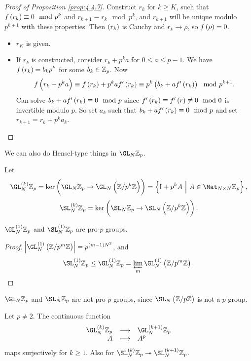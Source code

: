\begin{proof}[Proof of Proposition \ref{prop:4.4.7}]
Construct $ r_k $ for $ k \ge K $, such that $ f\br{r_k} \equiv 0 \mod p^k $ and $ r_{k + 1} \equiv r_k \mod p^k $, and $ r_{k + 1} $ will be unique modulo $ p^{k + 1} $ with these properties. Then $ \br{r_k} $ is Cauchy and $ r_k \to \rho $, so $ f\br{\rho} = 0 $.
\begin{itemize}
\item $ r_K $ is given.
\item If $ r_k $ is constructed, consider $ r_k + p^ka $ for $ 0 \le a \le p - 1 $. We have $ f\br{r_k} = b_kp^k $ for some $ b_k \in \mathbb{Z}_p $. Now
$$ f\br{r_k + p^ka} \equiv f\br{r_k} + p^kaf'\br{r_k} \equiv p^k\br{b_k + af'\br{r_k}} \mod p^{k + 1}. $$
Can solve $ b_k + af'\br{r_k} \equiv 0 \mod p $ since $ f'\br{r_k} \equiv f'\br{r} \not\equiv 0 \mod 0 $ is invertible modulo $ p $. So set $ a_k $ such that $ b_k + af'\br{r_k} \equiv 0 \mod p $ and set $ r_{k + 1} = r_k + p^ka_k $.
\end{itemize}
\end{proof}

\pagebreak

We can also do Hensel-type things in $ \GL_N \ZZ_p $.

\begin{definition}
Let
$$ \GL_N^{\br{k}} \ZZ_p = \ker \br{\GL_N \ZZ_p \to \GL_N \br{\ZZ / p^k\ZZ}} = \cbr{\I + p^kA \st A \in \Mat_{N \times N} \ZZ_p}, $$
$$ \SL_N^{\br{k}} \ZZ_p = \ker \br{\SL_N \ZZ_p \to \SL_N \br{\ZZ / p^k\ZZ}}. $$
\end{definition}

\begin{proposition}
$ \GL_N^{\br{1}} \ZZ_p $ and $ \SL_N^{\br{1}} \ZZ_p $ are pro-$ p $ groups.
\end{proposition}

\begin{proof}
$ \abs{\GL_N^{\br{1}} \br{\ZZ / p^m\ZZ}} = p^{\br{m - 1}N^2} $, and
$$ \SL_N^{\br{1}} \ZZ_p \le \GL_N^{\br{1}} \ZZ_p = \varprojlim_m \GL_N^{\br{1}} \br{\ZZ / p^m\ZZ}. $$
\end{proof}

\begin{remark}
$ \GL_N \ZZ_p $ and $ \SL_N \ZZ_p $ are not pro-$ p $ groups, since $ \SL_N \br{\ZZ / p\ZZ} $ is not a $ p $-group.
\end{remark}

\begin{proposition}
Let $ p \ne 2 $. The continuous function
$$ \function{\GL_N^{\br{k}} \ZZ_p}{\GL_N^{\br{k + 1}} \ZZ_p}{A}{A^p} $$
maps surjectively for $ k \ge 1 $. Also for $ \SL_N^{\br{k}} \ZZ_p \twoheadrightarrow \SL_N^{\br{k + 1}} \ZZ_p $.
\end{proposition}

